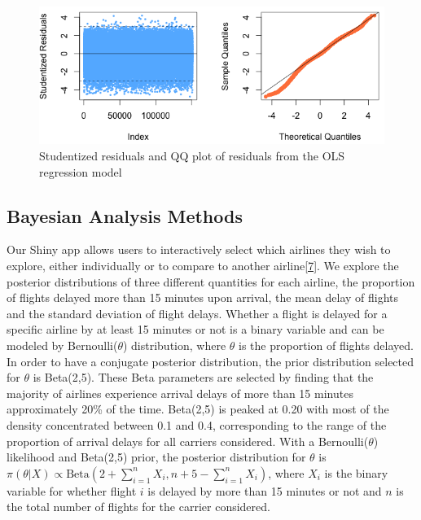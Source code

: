 \documentclass{article} %
\begin{document}
 


\begin{figure}[h]

\begin{center}
\includegraphics[width=\textwidth,height=\textheight,keepaspectratio]{model_diagnostics.png}
\caption{Studentized residuals and QQ plot of residuals from the OLS regression model\label{diagnostics}}

\end{center}
\end{figure}

\subsection{Bayesian Analysis Methods}
\label{appendix_bayes}



Our Shiny app allows users to interactively select which airlines they wish to explore, either individually or to compare to another airline\hyperlink{Ref7}{[7]}. We explore the posterior distributions of three different quantities for each airline, the proportion of flights delayed more than 15 minutes upon arrival, the mean delay of flights and the standard deviation of flight delays. Whether a flight is delayed for a specific airline by at least 15 minutes or not is a binary variable and can be modeled by Bernoulli($\theta$) distribution, where $\theta$ is the proportion of flights delayed. In order to have a conjugate posterior distribution, the prior distribution selected for $\theta$ is Beta(2,5). These Beta parameters are selected by finding that the majority of airlines experience arrival delays of more than 15 minutes approximately 20\% of the time. Beta(2,5) is peaked at 0.20 with most of the density concentrated between 0.1 and 0.4, corresponding to the range of the proportion of arrival delays for all carriers considered. With a Bernoulli($\theta$) likelihood and Beta(2,5) prior, the posterior distribution for $\theta$ is $\pi (\theta | X)\propto\mbox{Beta}(2+\sum_{i=1}^n X_i, n+5-\sum_{i=1}^n X_i)$, where $X_i$ is the binary variable for whether flight $i$ is delayed by more than 15 minutes or not and $n$ is the total number of flights for the carrier considered.   
\end{document}
